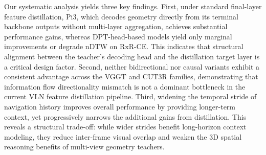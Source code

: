 Our systematic analysis yields three key findings. First, under standard final-layer feature distillation, Pi3, which decodes geometry directly from its terminal backbone outputs without multi-layer aggregation, achieves substantial performance gains, whereas DPT-head-based models yield only marginal improvements or degrade nDTW on RxR-CE. This indicates that structural alignment between the teacher's decoding head and the distillation target layer is a critical design factor. Second, neither bidirectional nor causal variants exhibit a consistent advantage across the VGGT and CUT3R families, demonstrating that information flow directionality mismatch is not a dominant bottleneck in the current VLN feature distillation pipeline. Third, widening the temporal stride of navigation history improves overall performance by providing longer-term context, yet progressively narrows the additional gains from distillation. This reveals a structural trade-off: while wider strides benefit long-horizon context modeling, they reduce inter-frame visual overlap and weaken the 3D spatial reasoning benefits of multi-view geometry teachers.
